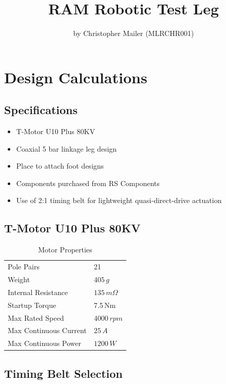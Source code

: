 \documentclass[11pt, titlepage]{article}
\begin{document}
\title{RAM Robotic Test Leg}
\author{by Christopher Mailer (MLRCHR001)}
\maketitle


\tableofcontents

\newpage
\section{Design Calculations}
\subsection{Specifications}
\begin{itemize}
	\item T-Motor U10 Plus 80KV
	\item Coaxial 5 bar linkage leg design
	\item Place to attach foot designs
	\item Components purchased from RS Components
	\item Use of 2:1 timing belt for lightweight quasi-direct-drive actuation
\end{itemize}

\subsection{T-Motor U10 Plus 80KV}
\begin{table}[h]
\centering
\caption*{Motor Properties}
\begin{tabular}{ l l }
\hline
 Pole Pairs & 21 \\
 Weight & $405\,g$ \\
 Internal Resistance & $135\,m\Omega$ \\
 Startup Torque & 7.5\,Nm \\
 Max Rated Speed & $4000\,rpm$ \\
 Max Continuous Current & $25\,A$ \\
 Max Continuous Power & $1200\,W$ \\\hline
\end{tabular}
\end{table}

\subsection{Timing Belt Selection}
\end{document}
